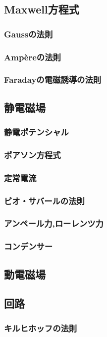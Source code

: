 \documentclass[dvipdfmx,uplatex]{jsarticle}
\begin{document}
\subsection{Maxwell方程式}

\subsubsection{Gaussの法則}

\subsubsection{Amp\`{e}reの法則}

\subsubsection{Faradayの電磁誘導の法則}

\subsection{静電磁場}

\subsubsection{静電ポテンシャル}

\subsubsection{ポアソン方程式}

\subsubsection{定常電流}

\subsubsection{ビオ・サバールの法則}

\subsubsection{アンペール力,ローレンツ力}

\subsubsection{コンデンサー}

\subsection{動電磁場}

\subsection{回路}

\subsubsection{キルヒホッフの法則}
\end{document}
